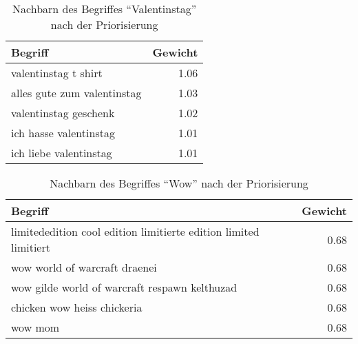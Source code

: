 \begin{table}
\centering
\begin{tabular*}{0.9\textwidth}{@{\extracolsep{\fill} } lr}
    \toprule
    Begriff & Gewicht \\
    \midrule
    valentinstag t shirt & \num{1.06} \\
    alles gute zum valentinstag & \num{1.03} \\
    valentinstag geschenk & \num{1.02} \\
    ich hasse valentinstag & \num{1.01} \\
    ich liebe valentinstag & \num{1.01} \\
    \bottomrule
\end{tabular*}
\caption{Nachbarn des Begriffes ``Valentinstag'' nach der Priorisierung}
\label{tab:prio_res_valentinstag}
\end{table}

\begin{table}
\centering
\begin{tabular*}{0.9\textwidth}{@{\extracolsep{\fill} } lr}
    \toprule
    Begriff & Gewicht \\
    \midrule
    limitededition cool edition limitierte edition limited limitiert & \num{0.68} \\
    wow world of warcraft draenei & \num{0.68} \\
    wow gilde world of warcraft respawn kelthuzad & \num{0.68} \\
    chicken wow heiss chickeria & \num{0.68} \\
    wow mom & \num{0.68} \\
    \bottomrule
\end{tabular*}
\caption{Nachbarn des Begriffes ``Wow'' nach der Priorisierung}
\label{tab:prio_res_wow}
\end{table}